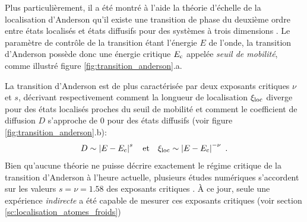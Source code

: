 Plus particulièrement, il a été montré à l'aide la théorie d'échelle de la localisation d'Anderson qu'il existe une transition de phase du deuxième ordre entre états localisés et états diffusifs pour des systèmes à trois dimensions \citep{abrahams1979scaling}. Le paramètre de contrôle de la transition étant l'énergie $E$ de l'onde, la transition d'Anderson possède donc une énergie critique $E_{\mathrm{c}}$ appelée \emph{seuil de mobilité}, comme illustré figure \ref{fig:transition_anderson}.a. 

La transition d'Anderson est de plus caractérisée par deux exposants critiques $\nu$ et $s$, décrivant respectivement comment la longueur de localisation $\xi_{\mathrm{loc}}$ diverge pour des états localisés proches du seuil de mobilité et comment le coefficient de diffusion $D$ s'approche de $0$ pour des états diffusifs (voir figure \ref{fig:transition_anderson}.b):
\begin{equation}
D \sim \left| E-E_{\mathrm{c}} \right|^s \quad \text{et} \quad \xi_{\mathrm{loc}} \sim \left| E-E_{\mathrm{c}} \right|^{-\nu} \text{ .}
\end{equation}
Bien qu'aucune théorie ne puisse décrire exactement le régime critique de la transition d'Anderson à l'heure actuelle, plusieurs études numériques s'accordent sur les valeurs $s=\nu=1.58$ des exposants critiques \citep{evers2008anderson,slevin1999corrections,slevin2014critical}. À ce jour, seule une expérience \textit{indirecte} a été capable de mesurer ces exposants critiques (voir section \ref{sc:localisation_atomes_froids}) \citep{lopez2012experimental}


